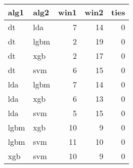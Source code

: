 \begin{tabular}{llrrr}
  \toprule
{\bfseries alg1} & {\bfseries alg2} & {\bfseries win1} & {\bfseries win2} & {\bfseries ties} \\ 
  \midrule
dt & lda & 7 & 14 & 0 \\ 
  dt & lgbm & 2 & 19 & 0 \\ 
  dt & xgb & 2 & 17 & 0 \\ 
  dt & svm & 6 & 15 & 0 \\ 
  lda & lgbm & 7 & 14 & 0 \\ 
  lda & xgb & 6 & 13 & 0 \\ 
  lda & svm & 5 & 15 & 0 \\ 
  lgbm & xgb & 10 & 9 & 0 \\ 
  lgbm & svm & 11 & 10 & 0 \\ 
  xgb & svm & 10 & 9 & 0 \\ 
   \bottomrule
\end{tabular}
